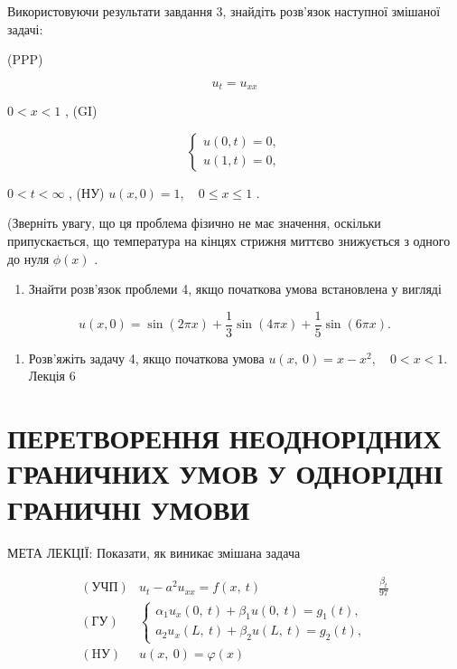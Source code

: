 \documentclass[
  ukrainian,
]{article}
\providecommand{\tightlist}{%
  \setlength{\itemsep}{0pt}\setlength{\parskip}{0pt}}
\begin{document}
Використовуючи результати завдання 3, знайдіть розв'язок наступної
змішаної задачі:

(PPP)

\[
u_t = u_{xx}
\]

\(0 < x < 1\) , (GI)

\[
\begin{cases} u(0, t) = 0, \\ u(1, t) = 0, \end{cases}
\]

\(0 < t < \infty\) , (НУ) \(u(x, 0) = 1, \quad 0 \le x \le 1\) .

(Зверніть увагу, що ця проблема фізично не має значення, оскільки
припускається, що температура на кінцях стрижня миттєво знижується з
одного до нуля \(\phi(x)\) .

\begin{enumerate}
\def\labelenumi{\arabic{enumi}.}
\setcounter{enumi}{4}
\tightlist
\item
  Знайти розв'язок проблеми 4, якщо початкова умова встановлена у
  вигляді
\end{enumerate}

\[
u(x, 0) = \sin(2\pi x) + \frac{1}{3}\sin(4\pi x) + \frac{1}{5}\sin(6\pi x).
\]

\begin{enumerate}
\def\labelenumi{\arabic{enumi}.}
\setcounter{enumi}{5}
\tightlist
\item
  Розв'яжіть задачу 4, якщо початкова умова
  \(u\left( x,\ 0\right) =x-x^{2},\quad 0< x<1.\) Лекція 6
\end{enumerate}

\section{ПЕРЕТВОРЕННЯ НЕОДНОРІДНИХ ГРАНИЧНИХ УМОВ У ОДНОРІДНІ ГРАНИЧНІ
УМОВИ}\label{ux43fux435ux440ux435ux442ux432ux43eux440ux435ux43dux43dux44f-ux43dux435ux43eux434ux43dux43eux440ux456ux434ux43dux438ux445-ux433ux440ux430ux43dux438ux447ux43dux438ux445-ux443ux43cux43eux432-ux443-ux43eux434ux43dux43eux440ux456ux434ux43dux456-ux433ux440ux430ux43dux438ux447ux43dux456-ux443ux43cux43eux432ux438}

МЕТА ЛЕКЦІЇ: Показати, як виникає змішана задача

\[
\begin{array}{lll} (\text{УЧП}) & u_t - a^2 u_{xx} = f\left(x, \ t\right) & \frac{\beta_t}{97} \\ (\text{ГУ}) & \begin{cases} \alpha_1 u_x\left(0, \ t\right) + \beta_1 u\left(0, \ t\right) = g_1\left(t\right), \\ a_2 u_x\left(L, \ t\right) + \beta_2 u\left(L, \ t\right) = g_2\left(t\right), \end{cases} \\ (\text{HУ}) & u\left(x, \ 0\right) = \varphi\left(x\right) \end{array}
\]
\end{document}
